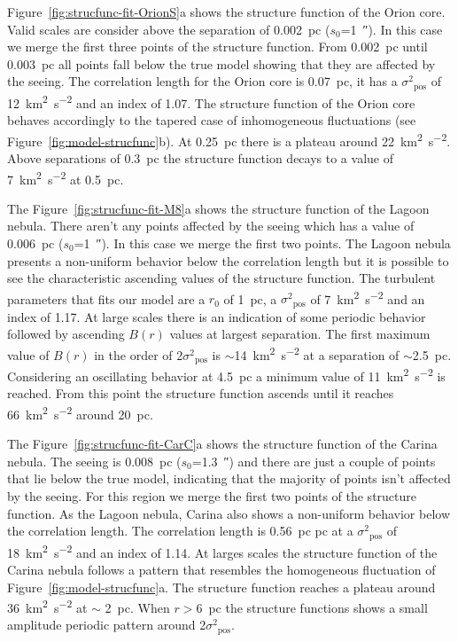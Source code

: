 \documentclass[fleqn,usenatbib, useAMS, a4paper]{mnras}
\newcommand\pos{\ensuremath{_{\mathrm{pos}}}}
\begin{document}
Figure~\ref{fig:strucfunc-fit-OrionS}a shows the structure function of the Orion core.
Valid scales are consider above the separation of \SI{0.002}{pc} (\(s_0\)=\SI{1}{\arcsecond}).
In this case we merge the first three points of the structure function.
From \SI{0.002}{pc} until \SI{0.003}{pc} all points fall below the true model showing that they are affected by the seeing. 
The correlation length for the Orion core is \SI{0.07}{pc}, it has a \(\sigma^2\pos\) of \SI{12}{km^{2}.s^{-2}} and an index of \num{1.07}.
The structure function of the Orion core behaves accordingly to the tapered case of inhomogeneous fluctuations (see Figure~\ref{fig:model-strucfunc}b).
At \SI{0.25}{pc} there is a plateau around \SI{22}{km^{2}.s^{-2}}.
Above separations of \SI{0.3}{pc} the structure function decays to a value of \SI{7}{km^{2}.s^{-2}} at  \SI{0.5}{pc}.

The Figure~\ref{fig:strucfunc-fit-M8}a shows the structure function of the Lagoon nebula.
There aren't any points affected by the seeing which has a value of \SI{0.006}{pc} (\(s_0\)=\SI{1}{\arcsecond}).
In this case we merge the first two points.
The Lagoon nebula presents a non-uniform behavior below the correlation length but it is possible to see the characteristic ascending values of the structure function.
The turbulent parameters that fits our model are a \(r_0\) of \SI{1}{pc}, a \(\sigma^2\pos\) of \SI{7}{km^{2}.s^{-2}} and an index of \num{1.17}.
At large scales there is an indication of some periodic behavior followed by ascending \(B(r)\) values at largest separation.
The first maximum value of \(B(r)\) in the order of 2\(\sigma^2\pos\) is \(\sim\)\SI{14}{km^{2}.s^{-2}} at a separation of \(\sim\)\SI{2.5}{pc}. 
Considering an oscillating behavior at \SI{4.5}{pc} a minimum value of \SI{11}{km^{2}.s^{-2}} is reached.
From this point the structure function ascends until it reaches \SI{66}{km^{2}.s^{-2}} around \SI{20}{pc}.

The Figure~\ref{fig:strucfunc-fit-CarC}a shows the structure function of the Carina nebula.
The seeing is \SI{0.008}{pc} (\(s_0\)=\SI{1.3}{\arcsecond}) and there are just a couple of points that lie below the true model, indicating that the majority of points isn't affected by the seeing.
For this region we merge the first two points of the structure function.
As the Lagoon nebula, Carina also shows a non-uniform behavior below the correlation length.
The correlation length is \SI{0.56}{pc} pc at a \(\sigma^2\pos\) of \SI{18}{km^{2}.s^{-2}} and an index of \num{1.14}.
At larges scales the structure function of the Carina nebula follows a pattern that resembles the homogeneous fluctuation of Figure~\ref{fig:model-strucfunc}a.
The structure function reaches a plateau around \SI{36}{km^{2}.s^{-2}} at \(\sim\) \SI{2}{pc}.
When \(r >\)\SI{6}{pc} the structure functions shows a small amplitude periodic pattern around 2\(\sigma^2\pos\).
\end{document}
